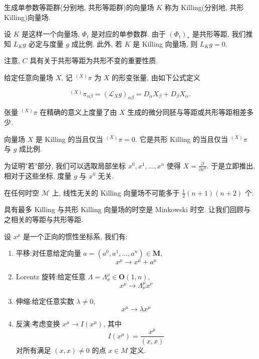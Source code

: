 \begin{definition}\label{def:cG-4.3}
生成单参数等距群(分别地, 共形等距群)的向量场 $K$ 称为 Killing(分别地, 共形 Killing)向量场. 
\end{definition}

设 $K$ 是这样一个向量场, $\Phi_{t}$ 是对应的单参数群. 由于 $(\Phi_{t})_{*}$ 是共形等距, 我们推知 $L_{K}g$ 必定与度量 $g$ 成比例. 此外, 若 $K$ 是 Killing 向量场, 则 $L_{K}g = 0$. 

注意, $C$ 具有关于共形等距为共形不变的重要性质. 

\begin{definition}\label{def:cG-4.4}
给定任意向量场 $X$, 记 $^{(X)}\pi$ 为 $X$ 的形变张量, 由如下公式定义

\[
{ } ^ { ( X ) } \pi _ { \alpha \beta } = ( \mathcal { L } _ { X } g ) _ { \alpha \beta } = D _ { \alpha } X _ { \beta } + D _ { \beta } X _ { \alpha } .
\]
\end{definition}

张量 $^{(X)}\pi$ 在精确的意义上度量了由 $X$ 生成的微分同胚与等距或共形等距相差多少. 

\begin{proposition}\label{prop:cG-4.5}
向量场 $X$ 是 Killing 的当且仅当 $^{(X)}\pi = 0$. 它是共形 Killing 的当且仅当 $^{(X)}\pi$ 与 $g$ 成比例. 
\end{proposition}

为证明"若"部分, 我们可以选取局部坐标 $x^{0},  x^{1},  \ldots,  x^{n}$ 使得 $X = \frac{\partial}{\partial x^{0}}$. 于是立即推出, 相对于这些坐标, 度量 $g$ 与 $x^{0}$ 无关. 

\begin{proposition}\label{prop:cG-4.6}
在任何时空 $\mathcal{M}$ 上, 线性无关的 Killing 向量场不可能多于 $\frac{1}{2} (n + 1)(n + 2)$ 个. 
\end{proposition}

具有最多 Killing 与共形 Killing 向量场的时空是 Minkowski 时空. 让我们回顾与之相关的等距与共形等距. 

设 $x^{\mu}$ 是一个正向的惯性坐标系, 我们有:

\begin{enumerate}
\item 平移:对任意给定向量 $a = (a^{0},  a^{1},  \ldots,  a^{n}) \in \mathbf{M}$, 
\[
x^{\mu} \rightarrow x^{\mu} + a^{\mu}
\]
\item Lorentz 旋转:给定任意 $\Lambda = \Lambda_{\sigma}^{\rho} \in \mathbf{O}(1,  n)$, 
\[
x^{\mu} \rightarrow \Lambda_{\nu}^{\mu} x^{\nu}
\]
\item 伸缩:给定任意实数 $\lambda \neq 0$, 
\[
x^{\mu} \to \lambda x^{\mu}
\]
\item 反演:考虑变换 $x^{\mu} \rightarrow I(x^{\mu})$, 其中
\[
I (x^{\mu}) = \frac {x^{\mu}}{(x ,  x)}
\]
对所有满足 $(x,  x) \neq 0$ 的点 $x \in M$ 定义. 
\end{enumerate}

